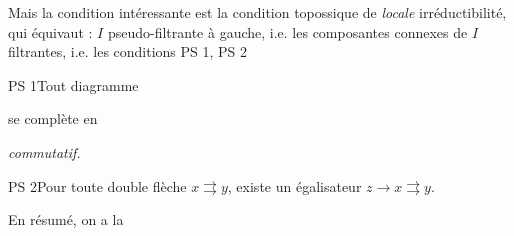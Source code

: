 Mais la condition intéressante est la condition topossique de \textit{locale} irréductibilité, qui équivaut : $I$ pseudo-filtrante à gauche, i.e. les composantes connexes de $I$ filtrantes, i.e. les conditions PS 1, PS 2

PS 1\enspace Tout diagramme  se complète en  \textit{commutatif.}

PS 2\enspace Pour toute double flèche $x \rightrightarrows y$, existe un égalisateur $z \longrightarrow x \rightrightarrows y$.



En résumé, on a la

